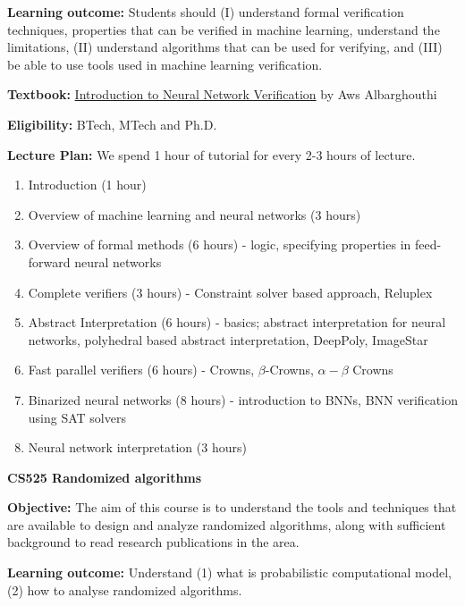 \documentclass[12pt, a4paper]{letter} %
\begin{document}
\textbf{Learning outcome:} Students should (I) understand formal verification techniques, properties that can be verified in machine learning, understand the limitations, (II) understand algorithms that can be used for verifying, and (III) be able to use tools used in machine learning verification.

\textbf{Textbook:} \hyperlink{https://verifieddeeplearning.com/}{Introduction to Neural Network Verification} by Aws Albarghouthi

\textbf{Eligibility:} BTech, MTech and Ph.D.



\noindent
\textbf{Lecture Plan:}
We spend 1 hour of tutorial for every 2-3 hours of lecture.
\begin{enumerate}
\item Introduction (1 hour)
\item Overview of machine learning and neural networks (3 hours)
\item Overview of formal methods (6 hours) - logic, specifying properties in feed-forward neural networks
\item Complete verifiers (3 hours) - Constraint solver based approach, Reluplex
\item Abstract Interpretation (6 hours) - basics; abstract interpretation for neural networks, polyhedral based abstract interpretation, DeepPoly, ImageStar
\item Fast parallel verifiers (6 hours) - Crowns, $\beta$-Crowns, $\alpha-\beta$ Crowns
\item Binarized neural networks (8 hours) - introduction to BNNs, BNN verification using SAT solvers
\item Neural network interpretation (3 hours)
\end{enumerate}

\newpage
\begin{center}
    \textbf{CS525 Randomized algorithms}
\end{center}
\textbf{Objective:} The aim of this course is to understand the tools and techniques that are available to
design and analyze randomized algorithms, along with sufficient background to read
research publications in the area.

\textbf{Learning outcome:} Understand (1) what is probabilistic computational model, (2) how to analyse randomized algorithms.
\end{document}
